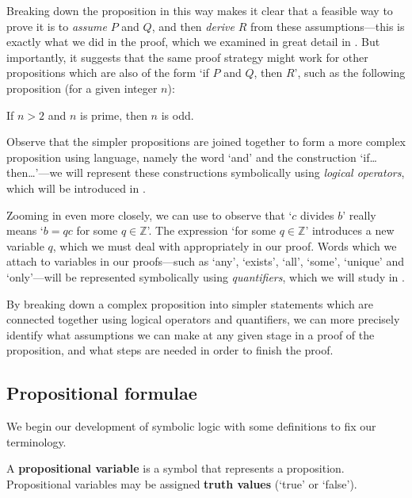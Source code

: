 Breaking down the proposition in this way makes it clear that a feasible way to prove it is to \textit{assume} $P$ and $Q$, and then \textit{derive} $R$ from these assumptions---this is exactly what we did in the proof, which we examined in great detail in . But importantly, it suggests that the same proof strategy might work for other propositions which are also of the form `if $P$ and $Q$, then $R$', such as the following proposition (for a given integer $n$):

\begin{center}
If $n > 2$ and $n$ is prime, then $n$ is odd.
\end{center}

Observe that the simpler propositions are joined together to form a more complex proposition using language, namely the word `and' and the construction `if\dots{} then\dots{}'---we will represent these constructions symbolically using \textit{logical operators}, which will be introduced in .

Zooming in even more closely, we can use  to observe that `$c$ divides $b$' really means `$b = qc$ for some $q \in \mathbb{Z}$'. The expression `for some $q \in \mathbb{Z}$' introduces a new variable $q$, which we must deal with appropriately in our proof. Words which we attach to variables in our proofs---such as `any', `exists', `all', `some', `unique' and `only'---will be represented symbolically using \textit{quantifiers}, which we will study in .

By breaking down a complex proposition into simpler statements which are connected together using logical operators and quantifiers, we can more precisely identify what assumptions we can make at any given stage in a proof of the proposition, and what steps are needed in order to finish the proof.

\subsection*{Propositional formulae}

We begin our development of symbolic logic with some definitions to fix our terminology.

\begin{definition}
\label{defPropositionalVariable}
A \textbf{propositional variable} is a symbol that represents a proposition. Propositional variables may be assigned \textbf{truth values} (`true' or `false').
\end{definition}

